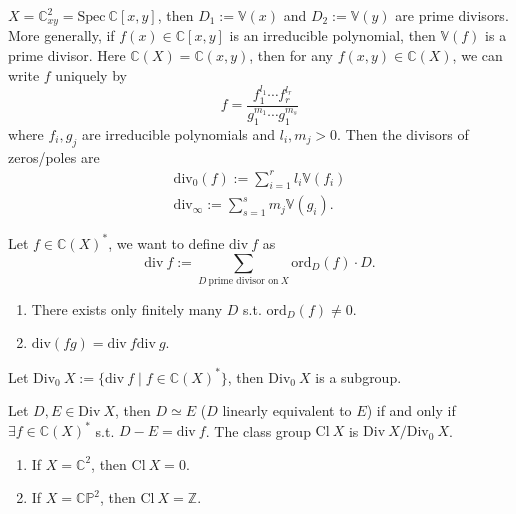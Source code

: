 \documentclass[a4paper,12pt]{amsart}
\newcommand{\ZZ}{\mathbb{Z}}
\newcommand{\CC}{\mathbb{C}}
\begin{document}
\begin{example}
	$X=\CC_{xy}^2=\mathrm{Spec}~\CC[x,y]$, then $D_1:=\mathbb{V}(x)$ and $D_2:=\mathbb{V}(y)$ are prime divisors. More generally, if $f(x)\in\CC[x,y]$ is an irreducible polynomial, then $\mathbb{V}(f)$ is a prime divisor. Here $\CC(X)=\CC(x,y)$, then for any $f(x,y)\in\CC(X)$, we can write $f$ uniquely by
	\begin{displaymath}
	f=\frac{f_1^{l_1}\cdots f_r^{l_r}}{g_1^{m_1}\cdots g_1^{m_s}}
	\end{displaymath}
	where $f_i,g_j$ are irreducible polynomials and $l_i,m_j>0$. Then the divisors of zeros/poles are
	\begin{align*}
	\mathrm{div}_0(f):=\sum_{i=1}^{r}l_i\mathbb{V}(f_i)\\
	\mathrm{div}_\infty:=\sum_{s=1}^{s}m_j\mathbb{V}(g_i).
	\end{align*}
\end{example}

\begin{definition}
	Let $f\in\CC(X)^*$, we want to define $\mathrm{div}~f$ as
	\begin{displaymath}
	\mathrm{div}~f:=\sum_{D~\text{prime divisor on}~X}\mathrm{ord}_D(f)\cdot D.
	\end{displaymath}
\end{definition}

\begin{Fact}
	\begin{enumerate}
		\item There exists only finitely many $D$ s.t. $\mathrm{ord}_D(f)\neq0$.
		\item $\mathrm{div}(fg)=\mathrm{div}~f\mathrm{div}~g$.
	\end{enumerate}
\end{Fact}

Let $\mathrm{Div}_0~X:=\{\mathrm{div}~f\mid f\in\CC(X)^*\}$, then $\mathrm{Div}_0~X$ is a subgroup.

\begin{definition}
	Let $D,E\in\mathrm{Div}~X$, then $D\simeq E$ ($D$ linearly equivalent to $E$) if and only if $\exists f\in\CC(X)^*$ s.t. $D-E=\mathrm{div}~f$. The class group $\mathrm{Cl}~X$ is $\mathrm{Div}~X/\mathrm{Div}_0~X$.
\end{definition}

\begin{example}
	\begin{enumerate}
		\item If $X=\CC^2$, then $\mathrm{Cl}~X=0$.
		\item If $X=\mathbb{CP}^2$, then $\mathrm{Cl}~X=\ZZ$.
	\end{enumerate}
\end{example}
\end{document}
